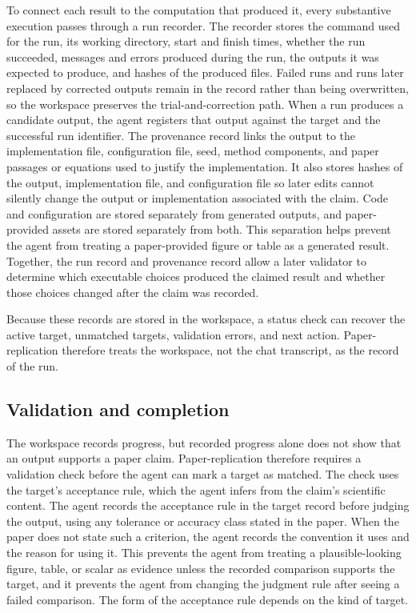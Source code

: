 \documentclass[authoryear,5p,times,nopreprintline]{elsarticle}
\begin{document}
To connect each result to the computation that produced it, every substantive execution passes through a run recorder.
The recorder stores the command used for the run, its working directory, start and finish times, whether the run succeeded, messages and errors produced during the run, the outputs it was expected to produce, and hashes of the produced files.
Failed runs and runs later replaced by corrected outputs remain in the record rather than being overwritten, so the workspace preserves the trial-and-correction path.
When a run produces a candidate output, the agent registers that output against the target and the successful run identifier.
The provenance record links the output to the implementation file, configuration file, seed, method components, and paper passages or equations used to justify the implementation.
It also stores hashes of the output, implementation file, and configuration file so later edits cannot silently change the output or implementation associated with the claim.
Code and configuration are stored separately from generated outputs, and paper-provided assets are stored separately from both.
This separation helps prevent the agent from treating a paper-provided figure or table as a generated result.
Together, the run record and provenance record allow a later validator to determine which executable choices produced the claimed result and whether those choices changed after the claim was recorded.

Because these records are stored in the workspace, a status check can recover the active target, unmatched targets, validation errors, and next action.
Paper-replication therefore treats the workspace, not the chat transcript, as the record of the run.

\subsection{Validation and completion}\label{sec:external_validation}
The workspace records progress, but recorded progress alone does not show that an output supports a paper claim.
Paper-replication therefore requires a validation check before the agent can mark a target as matched.
The check uses the target's acceptance rule, which the agent infers from the claim's scientific content.
The agent records the acceptance rule in the target record before judging the output, using any tolerance or accuracy class stated in the paper.
When the paper does not state such a criterion, the agent records the convention it uses and the reason for using it.
This prevents the agent from treating a plausible-looking figure, table, or scalar as evidence unless the recorded comparison supports the target, and it prevents the agent from changing the judgment rule after seeing a failed comparison.
The form of the acceptance rule depends on the kind of target.
\end{document}
